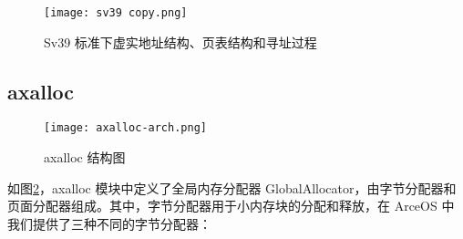 \begin{figure}
  \centering
  \texttt{[image: sv39 copy.png]}
  \caption{Sv39 标准下虚实地址结构、页表结构和寻址过程}
  \label{fig:sv39}
\end{figure}


\subsection{axalloc}

\begin{figure}
  \centering
  \texttt{[image: axalloc-arch.png]}
  \caption{axalloc 结构图}
  \label{fig:axalloc-arch}
\end{figure}

如图\ref{fig:axalloc-arch}，axalloc 模块中定义了全局内存分配器 GlobalAllocator，由字节分配器和页面分配器组成。其中，字节分配器用于小内存块的分配和释放，在 ArceOS 中我们提供了三种不同的字节分配器：
